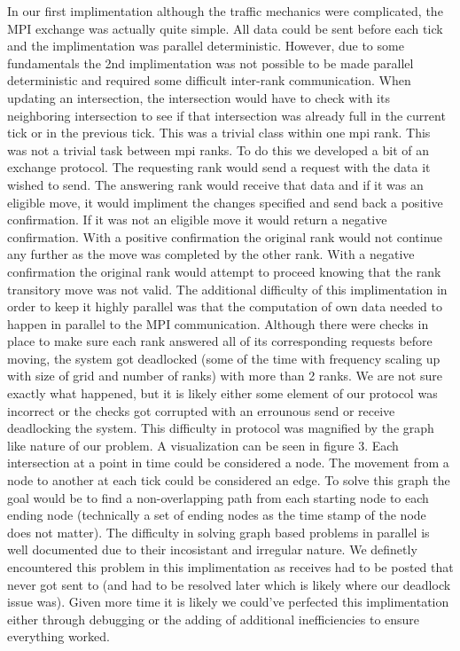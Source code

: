 \documentclass[10pt,a4paper]{article}
\begin{document}
    In our first implimentation although the traffic mechanics were complicated, the MPI exchange was actually quite simple. All data could be sent before each tick and the implimentation was parallel deterministic. However, due to some fundamentals the 2nd implimentation was not possible to be made parallel deterministic and required some difficult inter-rank communication. When updating an intersection, the intersection would have to check with its neighboring intersection to see if that intersection was already full in the current tick or in the previous tick. This was a trivial class within one mpi rank. This was not a trivial task between mpi ranks. To do this we developed a bit of an exchange protocol. The requesting rank would send a request with the data it wished to send. The answering rank would receive that data and if it was an eligible move, it would impliment the changes specified and send back a positive confirmation. If it was not an eligible move it would return a negative confirmation. With a positive confirmation the original rank would not continue any further as the move was completed by the other rank. With a negative confirmation the original rank would attempt to proceed knowing that the rank transitory move was not valid.
    The additional difficulty of this implimentation in order to keep it highly parallel was that the computation of own data needed to happen in parallel to the MPI communication. Although there
    were checks in place to make sure each rank answered all of its corresponding requests before moving,
    the system got deadlocked (some of the time with frequency scaling up with size of grid and number of ranks) with more than 2 ranks. We are not sure exactly what happened, but it is likely either some element of our protocol was incorrect or the checks got corrupted with an errounous send or receive
    deadlocking the system.
    This difficulty in protocol was magnified by the graph like nature of our problem. A visualization can be seen in figure 3. Each intersection at a point in time could be considered a node. The movement from a node to another at each tick could be considered an edge. To solve this graph the goal would be to find a non-overlapping path from each starting node to each ending node (technically a set of ending nodes as the time stamp of the node does not matter). The difficulty in solving graph based problems in parallel is well documented due to their incosistant and irregular nature. We definetly encountered this problem in this implimentation as receives had to be posted that never got sent to (and had to be resolved later which is likely where our deadlock issue was).
    Given more time it is likely we could've perfected this implimentation either through debugging or the adding of additional inefficiencies to ensure everything worked. 
    
\end{document}
